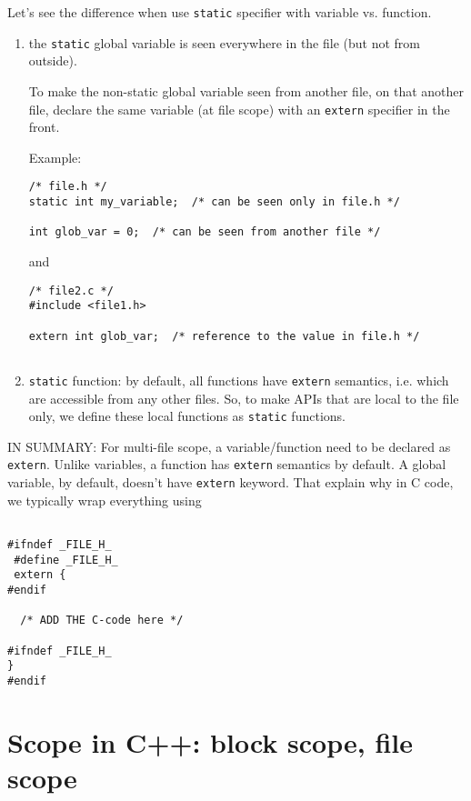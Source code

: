 Let's see the difference when use \verb!static! specifier with variable vs.
function.
\begin{enumerate}
    \item the \verb!static! global variable is seen everywhere in the file (but
    not from outside). 
    
    To make the non-static global variable seen from another
    file, on that another file, declare the same variable (at file scope) with an
  \verb!extern! specifier in the front. 

Example:
\begin{verbatim}
/* file.h */
static int my_variable;  /* can be seen only in file.h */

int glob_var = 0;  /* can be seen from another file */
\end{verbatim}
and
\begin{verbatim}
/* file2.c */
#include <file1.h>

extern int glob_var;  /* reference to the value in file.h */


\end{verbatim}

     \item \verb!static! function: by default, all functions have \verb!extern!
     semantics, i.e. which are accessible from any  other files. So, to make
     APIs that are local to the file only, we define these local functions as
     \verb!static! functions. 
  
    \end{enumerate}
  
IN SUMMARY: For multi-file scope, a variable/function need to be declared as
\verb!extern!. Unlike variables, a function has \verb!extern! semantics by
default. A global variable, by default, doesn't have \verb!extern! keyword.
That explain why in C code, we typically wrap everything using 

\begin{verbatim}

#ifndef _FILE_H_
 #define _FILE_H_
 extern {
#endif 

  /* ADD THE C-code here */

#ifndef _FILE_H_
}
#endif
\end{verbatim}



\section{Scope in C++: block scope, file scope}
\label{sec:scope_in-C++}

